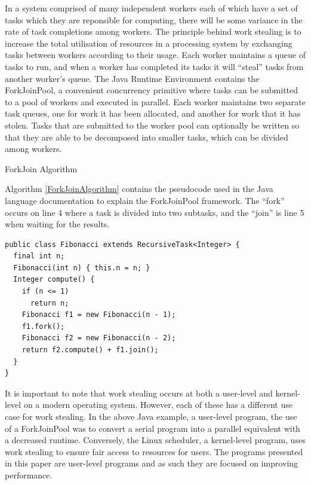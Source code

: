 \documentclass[12pt]{article}
\begin{document}
In a system comprised of many independent workers each of which have a set of tasks which they are reponsible for computing, there will be some variance in the rate of task completions among workers.
\newline
\newline
The principle behind work stealing is to increase the total utilisation of resources in a processing system by exchanging tasks between workers according to their usage. Each worker maintains a queue of tasks to run, and when a worker has completed its tasks it will ``steal'' tasks from another worker's queue.
\newline
\newline
The Java Runtime Environment contains the ForkJoinPool\cite{javaThreads}, a convenient concurrency primitive where tasks can be submitted to a pool of workers and executed in parallel. Each worker maintains two separate task queues, one for work it has been allocated, and another for work that it has stolen. Tasks that are submitted to the worker pool can optionally be written so that they are able to be decomposed into smaller tasks, which can be divided among workers.
\newline

\IncMargin{1em}
\begin{algorithm}[H]
 \caption{ForkJoin Algorithm}
 \label{ForkJoinAlgorithm}
\end{algorithm}
\DecMargin{1em}
\medskip
Algorithm \ref{ForkJoinAlgorithm} contains the pseudocode used in the Java language documentation to explain the ForkJoinPool framework. The ``fork'' occurs on line 4 where a task is divided into two subtasks, and the ``join'' is line 5 when waiting for the results.

\begin{lstlisting}[caption={An implementation of the Fibonacci algorithm using the ForkJoinFramework taken from the Java documentation},label=JavaRecursive]
public class Fibonacci extends RecursiveTask<Integer> {
  final int n;
  Fibonacci(int n) { this.n = n; }
  Integer compute() {
    if (n <= 1)
      return n;
    Fibonacci f1 = new Fibonacci(n - 1);
    f1.fork();
    Fibonacci f2 = new Fibonacci(n - 2);
    return f2.compute() + f1.join();
  }
}
\end{lstlisting}

It is important to note that work stealing occurs at both a user-level and kernel-level on a modern operating system. However, each of these has a different use case for work stealing. In the above Java example, a user-level program, the use of a ForkJoinPool was to convert a serial program into a parallel equivalent with a decreased runtime. Conversely, the Linux scheduler, a kernel-level program, uses work stealing to ensure fair access to resources for users. The programs presented in this paper are user-level programs and as such they are focused on improving performance.
\end{document}
